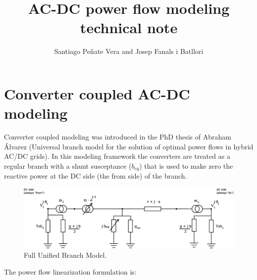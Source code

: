 \documentclass[11pt]{article}
\title{AC-DC power flow modeling technical note}
\author{Santiago Pe\~nate Vera and Josep Fanals i Batllori}
\begin{document}
	
	\maketitle
	
	
	\section{Converter coupled AC-DC modeling}
	
	Converter coupled modeling was introduced in the PhD thesis of Abraham Álvarez (Universal branch model for the solution of optimal power flows in hybrid AC/DC grids). In this modeling framework the converters are treated as a regular branch with a shunt susceptance ($b_{eq}$) that is used to make zero the reactive power at the DC side (the from side) of the branch.
	
	\begin{figure}[h!]
		\centering
		\includegraphics[width=0.8\linewidth]{fubm.eps}
		\caption{Full Unified Branch Model.}
		\label{fig:fubm}
	\end{figure}
	
	
	The power flow linearization formulation is:
	
\end{document}
